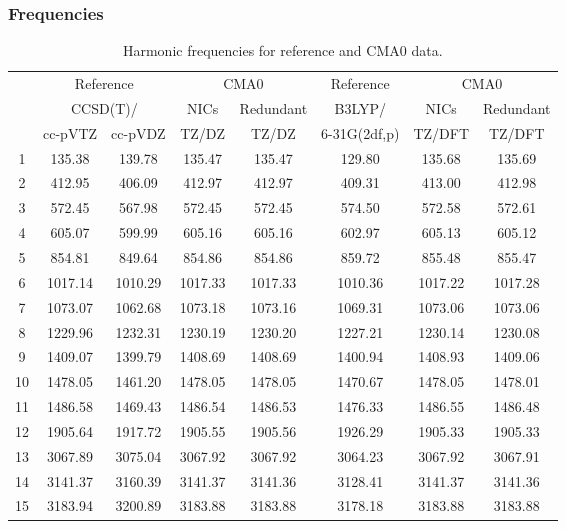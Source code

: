 \documentclass[10pt,oneside]{article}
\begin{document}
\begin{table}[h!]
\subsubsection*{Frequencies}
\centering
\caption{Harmonic frequencies for reference and CMA0 data.}
\begin{tabular}{cccccccc}
\toprule
{} & \multicolumn{2}{c}{Reference} & \multicolumn{2}{c}{CMA0} &    Reference & \multicolumn{2}{c}{CMA0} \\
{} & \multicolumn{2}{c}{CCSD(T)/} &    NICs &  Redundant &       B3LYP/ &    NICs & Redundant \\
{} &   cc-pVTZ & cc-pVDZ &   TZ/DZ &      TZ/DZ & 6-31G(2df,p) &  TZ/DFT &    TZ/DFT \\
\midrule
1  &    135.38 &  139.78 &  135.47 &     135.47 &       129.80 &  135.68 &    135.69 \\
2  &    412.95 &  406.09 &  412.97 &     412.97 &       409.31 &  413.00 &    412.98 \\
3  &    572.45 &  567.98 &  572.45 &     572.45 &       574.50 &  572.58 &    572.61 \\
4  &    605.07 &  599.99 &  605.16 &     605.16 &       602.97 &  605.13 &    605.12 \\
5  &    854.81 &  849.64 &  854.86 &     854.86 &       859.72 &  855.48 &    855.47 \\
6  &   1017.14 & 1010.29 & 1017.33 &    1017.33 &      1010.36 & 1017.22 &   1017.28 \\
7  &   1073.07 & 1062.68 & 1073.18 &    1073.16 &      1069.31 & 1073.06 &   1073.06 \\
8  &   1229.96 & 1232.31 & 1230.19 &    1230.20 &      1227.21 & 1230.14 &   1230.08 \\
9  &   1409.07 & 1399.79 & 1408.69 &    1408.69 &      1400.94 & 1408.93 &   1409.06 \\
10 &   1478.05 & 1461.20 & 1478.05 &    1478.05 &      1470.67 & 1478.05 &   1478.01 \\
11 &   1486.58 & 1469.43 & 1486.54 &    1486.53 &      1476.33 & 1486.55 &   1486.48 \\
12 &   1905.64 & 1917.72 & 1905.55 &    1905.56 &      1926.29 & 1905.33 &   1905.33 \\
13 &   3067.89 & 3075.04 & 3067.92 &    3067.92 &      3064.23 & 3067.92 &   3067.91 \\
14 &   3141.37 & 3160.39 & 3141.37 &    3141.36 &      3128.41 & 3141.37 &   3141.36 \\
15 &   3183.94 & 3200.89 & 3183.88 &    3183.88 &      3178.18 & 3183.88 &   3183.88 \\
\bottomrule
\end{tabular}
\end{table}
\end{document}
